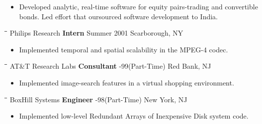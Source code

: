 \begin{resume}
   \vspace{-10pt}  
   \begin{itemize}
   \item Developed analytic, real-time software for equity pairs-trading and
   convertible bonds. Led effort that oursourced software development
   to India.
   \end{itemize}
   \vspace{-15pt}
%
   \begin{tabbing} \hspace{1.4in}\= \hspace{2.3in}\= \hspace{1.6in}\= \kill 
    Philips Research \> {\bf Intern} \>Summer 2001  \>Scarborough, NY
   \end{tabbing}
   \vspace{-10pt}
   \begin{itemize}
   \item Implemented temporal and spatial scalability in the MPEG-4 codec.
   \end{itemize}
   \vspace{-15pt}
%
   \begin{tabbing} \hspace{1.4in}\= \hspace{2.3in}\= \hspace{1.6in}\= \kill 
    AT\&T Research Labs \> {\bf Consultant} -99(Part-Time) \>Red Bank, NJ
   \end{tabbing}
   \vspace{-10pt}
   \begin{itemize}
   \item Implemented image-search features in a virtual shopping environment.
   \end{itemize}
   \vspace{-15pt}
%
   \begin{tabbing} \hspace{1.4in}\= \hspace{2.3in}\= \hspace{1.6in}\= \kill 
    BoxHill Systems \> {\bf Engineer} -98(Part-Time) \>New York, NJ
   \end{tabbing}
   \vspace{-10pt}
   \begin{itemize}
     \item Implemented low-level Redundant Arrays of Inexpensive Disk
     system code.
   \end{itemize}

\vspace{-10pt}

\end{resume}
